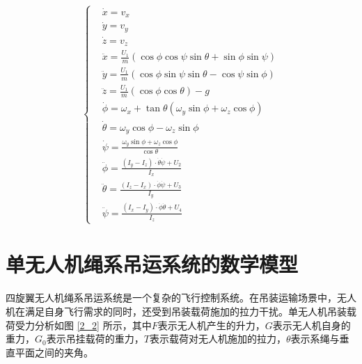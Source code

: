 \documentclass[lang=chs, degree=master, blindreview=false, winfonts=true]{yanputhesis}
\begin{document}
\begin{equation}
		\left\{
	\begin{aligned}
		&\dot{x}=v_{x}\\
		&\dot{y}=v_{y}\\
		&\dot{z}=v_{z}\\
		&\ddot{x}=\frac{U_{1}}{m}\left(\cos\phi\cos\psi\sin\theta+\sin\phi\sin\psi\right)\\
		&\ddot{y}=\frac{U_{1}}{m}\left(\cos\phi\sin\psi\sin\theta-\cos\psi\sin\phi\right)\\
		&\ddot{z}=\frac{U_{1}}{m}\left(\cos\phi\cos\theta\right)-g\\
		&\dot{\phi}={\omega}_x+\tan\theta\left({\omega}_y\sin\phi+{\omega}_z\cos\phi\right)\\
		&\dot{\theta}={\omega}_y\cos\phi-{\omega}_z\sin\phi\\
		&\dot{\psi}=\frac{{\omega}_y\sin\phi+{\omega}_z\cos\phi}{\cos\theta}\\
		&\ddot{\phi}=\frac{(I_{y}-I_{z})\cdot \dot{\theta}\dot{\psi}+U_{2}}{I_{x}}\\
		&\ddot{\theta}=\frac{(I_{z}-I_{x})\cdot \dot{\phi}\dot{\psi}+U_{3}}{I_{y}}\\
		&\ddot{\psi}=\frac{(I_{x}-I_{y})\cdot \dot{\phi}\dot{\theta}+U_{4}}{I_{z}}\end{aligned}
	\right.
	\label{2-7}
\end{equation}

\section{单无人机绳系吊运系统的数学模型}
四旋翼无人机绳系吊运系统是一个复杂的飞行控制系统。在吊装运输场景中，无人机在满足自身飞行需求的同时，还受到吊装载荷施加的拉力干扰。单无人机吊装载荷受力分析如图 \ref{2_2} 所示，其中$F$表示无人机产生的升力，$G$表示无人机自身的重力，$G_0$表示吊挂载荷的重力，$T$表示载荷对无人机施加的拉力，$\theta$表示系绳与垂直平面之间的夹角。
\end{document}
